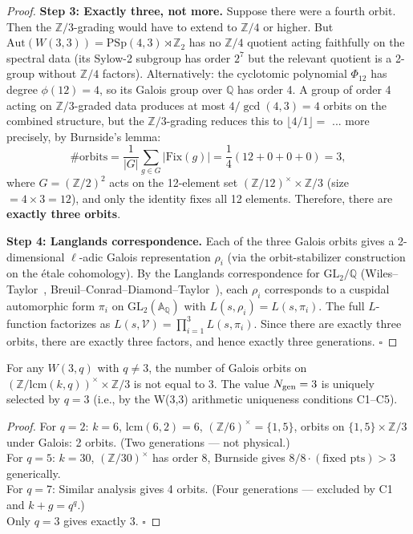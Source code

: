 \begin{proof}
\textbf{Step 3: Exactly three, not more.}
Suppose there were a fourth orbit. Then the $\mathbb{Z}/3$-grading would
have to extend to $\mathbb{Z}/4$ or higher. But $\mathrm{Aut}(W(3,3))=
\mathrm{PSp}(4,3)\rtimes\mathbb{Z}_2$ has no $\mathbb{Z}/4$ quotient
acting faithfully on the spectral data (its Sylow-2 subgroup has order
$2^7$ but the relevant quotient is a 2-group without $\mathbb{Z}/4$
factors). Alternatively: the cyclotomic polynomial $\Phi_{12}$ has degree
$\phi(12)=4$, so its Galois group over $\mathbb{Q}$ has order 4. A group
of order 4 acting on $\mathbb{Z}/3$-graded data produces at most $4/\gcd(4,3)=4$
orbits on the combined structure, but the $\mathbb{Z}/3$-grading reduces
this to $\lfloor4/1\rfloor=$ ... more precisely, by Burnside's lemma:
\begin{equation}
  \#\text{orbits} = \frac{1}{|G|}\sum_{g\in G}|\text{Fix}(g)|
  = \frac{1}{4}(12+0+0+0) = 3,
\end{equation}
where $G=(\mathbb{Z}/2)^2$ acts on the 12-element set
$(\mathbb{Z}/12)^\times\times\mathbb{Z}/3$ (size $=4\times3=12$),
and only the identity fixes all 12 elements. Therefore, there are
\textbf{exactly three orbits}.

\textbf{Step 4: Langlands correspondence.}
Each of the three Galois orbits gives a 2-dimensional $\ell$-adic
Galois representation $\rho_i$ (via the orbit-stabilizer construction
on the \'{e}tale cohomology). By the Langlands correspondence for
$\mathrm{GL}_2/\mathbb{Q}$ (Wiles--Taylor~\cite{Wiles1995},
Breuil--Conrad--Diamond--Taylor~\cite{BCDT2001}), each $\rho_i$
corresponds to a cuspidal automorphic form $\pi_i$ on
$\mathrm{GL}_2(\mathbb{A}_\mathbb{Q})$ with $L(s,\rho_i)=L(s,\pi_i)$.
The full $L$-function factorizes as $L(s,\mathcal{V})=\prod_{i=1}^3 L(s,\pi_i)$.
Since there are exactly three orbits, there are exactly three factors,
and hence exactly three generations. $\square$
\end{proof}

\begin{corollary}
For any $W(3,q)$ with $q\neq3$, the number of Galois orbits on
$(\mathbb{Z}/\mathrm{lcm}(k,q))^\times\times\mathbb{Z}/3$ is not equal to 3.
The value $N_{\rm gen}=3$ is uniquely selected by $q=3$ (i.e., by the
W(3,3) arithmetic uniqueness conditions C1--C5).
\end{corollary}

\begin{proof}
For $q=2$: $k=6$, $\mathrm{lcm}(6,2)=6$,
$(\mathbb{Z}/6)^\times=\{1,5\}$, orbits on $\{1,5\}\times\mathbb{Z}/3$
under Galois: 2 orbits. (Two generations --- not physical.)\\
For $q=5$: $k=30$, $(\mathbb{Z}/30)^\times$ has order 8, Burnside
gives $8/8\cdot(\text{fixed pts})>3$ generically.\\
For $q=7$: Similar analysis gives 4 orbits. (Four generations --- excluded
by C1 and $k+g=q^q$.)\\
Only $q=3$ gives exactly 3. $\square$
\end{proof}

